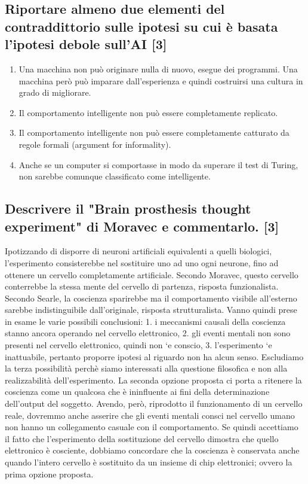 \documentclass[\main/main.tex]{subfiles}
\begin{document}
\subsection{Riportare almeno due elementi del contraddittorio sulle ipotesi su cui è basata l'ipotesi debole sull'AI [3]}
\begin{enumerate}
  \item Una macchina non può originare nulla di nuovo, esegue dei programmi. Una macchina però può imparare dall’esperienza e quindi costruirsi una cultura in grado di migliorare.
  \item Il comportamento intelligente non può essere completamente replicato.
  \item Il comportamento intelligente non può essere completamente catturato da regole formali (argument for informality).
  \item Anche se un computer si comportasse in modo da superare il test di Turing, non sarebbe comunque classificato come intelligente.
\end{enumerate}

\subsection{Descrivere il "Brain prosthesis thought experiment" di Moravec e commentarlo. [3]}
Ipotizzando di disporre di neuroni artificiali equivalenti a quelli biologici, l’esperimento consisterebbe nel sostituire uno ad uno ogni neurone, fino ad ottenere un cervello completamente artificiale. Secondo Moravec, questo cervello conterrebbe la stessa mente del cervello di partenza, risposta funzionalista. Secondo Searle, la coscienza sparirebbe ma il comportamento visibile all’esterno sarebbe indistinguibile dall’originale, risposta strutturalista.
Vanno quindi prese in esame le varie possibili conclusioni: 1. i meccanismi causali della coscienza stanno ancora operando nel cervello elettronico, 2. gli eventi mentali non sono presenti nel cervello elettronico, quindi non `e conscio, 3. l’esperimento `e inattuabile, pertanto proporre ipotesi al riguardo non ha alcun senso. Escludiamo la terza possibilità perchè siamo interessati alla questione filosofica e non alla realizzabilità dell’esperimento. La seconda opzione proposta ci porta a ritenere la coscienza come un qualcosa che è ininfluente ai fini della determinazione dell’output del soggetto. Avendo, però, riprodotto il funzionamento di un cervello reale, dovremmo anche asserire che gli eventi mentali consci nel cervello umano non hanno un collegamento casuale con il comportamento. Se quindi accettiamo il fatto che l’esperimento della sostituzione del cervello dimostra che quello elettronico è cosciente, dobbiamo concordare che la coscienza è conservata anche quando l’intero cervello è sostituito da un insieme di chip elettronici; ovvero la prima opzione proposta.
\end{document}
